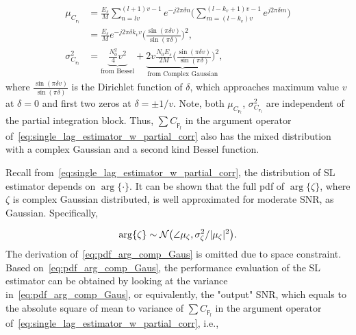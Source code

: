 \begin{equation}
  \begin{aligned}
  \label{eq:mean_var_product_coherent_int}
  \mu_{C_{\digamma_l}}&=\frac{E_s}{M}\sum_{n=lv}^{(l+1)v-1}e^{-j2\pi \delta n}\bigg(\sum_{m=(l-k_v)v}^{(l-k_v+1)v-1}e^{j2\pi \delta m}\bigg) \\
  &=\frac{E_s}{M}e^{-j2\pi \delta k_vv}\bigg(\frac{\sin(\pi \delta v)}{\sin(\pi \delta)}\bigg)^2, \\
  \sigma^2_{C_{\digamma_l}}&={\underbrace{\frac{N_0^2}{4}v^2}_{\text{from Bessel}}}+{\underbrace{2v\frac{N_0E_s}{2M}\bigg(\frac{\sin(\pi \delta v)}{\sin(\pi \delta)}\bigg)^2}_{\text{from Complex Gaussian}}},
  \end{aligned}
\end{equation}
where $\frac{\sin(\pi \delta v)}{\sin(\pi \delta)}$ is the Dirichlet function of $\delta$, which approaches
maximum value $v$ at $\delta{=}0$ and first two zeros at $\delta{=}\pm 1/v$.
Note, both $\mu_{C_{\digamma_l}}$, $\sigma^2_{C_{\digamma_l}}$ are independent of the partial integration block.
Thus, $\sum C_{\digamma_l}$ in the argument operator of~\eqref{eq:single_lag_estimator_w_partial_corr} 
also has the mixed distribution with a complex Gaussian and a second kind Bessel function.

Recall from~\eqref{eq:single_lag_estimator_w_partial_corr}, the distribution of SL estimator depends on $\arg\{\cdot\}$.
It can be shown that the full pdf of $\arg\{\zeta\}$, where $\zeta$ is complex Gaussian distributed, is well approximated for moderate SNR, as Gaussian.
Specifically,

\begin{equation}
  \label{eq:pdf_arg_comp_Gaus}
  \arg\{\zeta\} \sim \mathcal{N}\big(\angle \mu_{\zeta},\sigma^2_{\zeta}/|\mu_{\zeta}|^2\big).
\end{equation}
The derivation of~\eqref{eq:pdf_arg_comp_Gaus} is omitted due to space constraint.
Based on~\eqref{eq:pdf_arg_comp_Gaus}, the performance evaluation of 
the SL estimator can be obtained by looking at the variance in~\eqref{eq:pdf_arg_comp_Gaus},
or equivalently, the "output" SNR, which equals to the absolute square of mean to variance of
$\sum C_{\digamma_l}$ in the argument operator of~\eqref{eq:single_lag_estimator_w_partial_corr}, i.e.,

